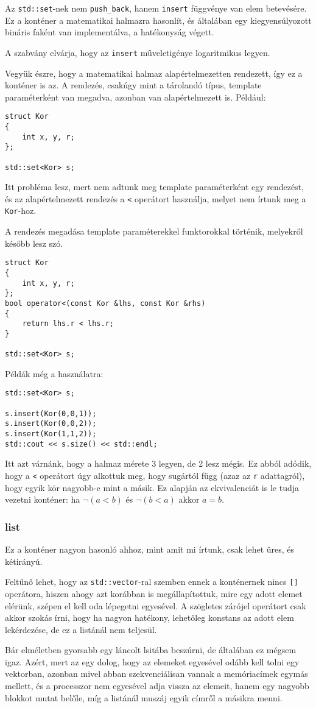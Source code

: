 \documentclass[a4paper,11.5pt]{article}
\begin{document}
	\smallskip
	Az \texttt{std::set}-nek nem \texttt{push\_back}, hanem \texttt{insert} függvénye van elem betevésére. Ez a konténer a matematikai halmazra hasonlít, és általában egy kiegyensúlyozott bináris faként van implementálva, a hatékonyság végett.
	\begin{note}
		A szabvány elvárja, hogy az \texttt{insert} műveletigénye logaritmikus legyen.
	\end{note}
	Vegyük észre, hogy a matematikai halmaz alapértelmezetten rendezett, így ez a konténer is az. A rendezés, csakúgy mint a tárolandó típus, template paraméterként van megadva, azonban van alapértelmezett is. Például:
	\begin{lstlisting}
struct Kor
{
	int x, y, r;
};

std::set<Kor> s;
	\end{lstlisting}
	Itt probléma lesz, mert nem adtunk meg template paraméterként egy rendezést, és az alapértelmezett rendezés a \texttt{<} operátort használja, melyet nem írtunk meg a \texttt{Kor}-hoz.
	\begin{note}
		A rendezés megadása template paraméterekkel funktorokkal történik, melyekről később lesz szó.
	\end{note}
	\begin{lstlisting}
struct Kor
{
	int x, y, r;
};
bool operator<(const Kor &lhs, const Kor &rhs)
{
	return lhs.r < lhs.r;
}

std::set<Kor> s;
	\end{lstlisting}
	Példák még a használatra:
\begin{lstlisting}
std::set<Kor> s;

s.insert(Kor(0,0,1));
s.insert(Kor(0,0,2));
s.insert(Kor(1,1,2));
std::cout << s.size() << std::endl;
\end{lstlisting}
	Itt azt várnánk, hogy a halmaz mérete 3 legyen, de 2 lesz mégis. Ez abból adódik, hogy a \texttt{<} operátort úgy alkottuk meg, hogy sugártól függ (azaz az \texttt{r} adattagról), hogy egyik kör nagyobb-e mint a másik. Ez alapján az ekvivalenciát is le tudja vezetni konténer: ha $\neg(a<b)$ és $\neg(b<a)$ akkor $a=b$.
	\subsubsection{list}
	Ez a konténer nagyon hasonló ahhoz, mint amit mi írtunk, csak lehet üres, és kétirányú. 
	\smallskip
	
	Feltűnő lehet, hogy az \texttt{std::vector}-ral szemben ennek a konténernek nincs \texttt{[]} operátora, hiszen ahogy azt korábban is megállapítottuk, mire egy adott elemet elérünk, szépen el kell oda lépegetni egyesével. A szögletes zárójel operátort csak akkor szokás írni, hogy ha nagyon hatékony, lehetőleg konstans az adott elem lekérdezése, de ez a listánál nem teljesül.
	\begin{note}
		Bár elméletben gyorsabb egy láncolt lsitába beszúrni, de általában ez mégsem igaz. Azért, mert az egy dolog, hogy az elemeket egyesével odább kell tolni egy vektorban, azonban mivel abban szekvenciálisan vannak a memóriacímek egymás mellett, és a processzor nem egyesével adja vissza az elemeit, hanem egy nagyobb blokkot mutat belőle, míg a listánál muszáj egyik címről a másikra menni.
	\end{note}
	
\end{document}
